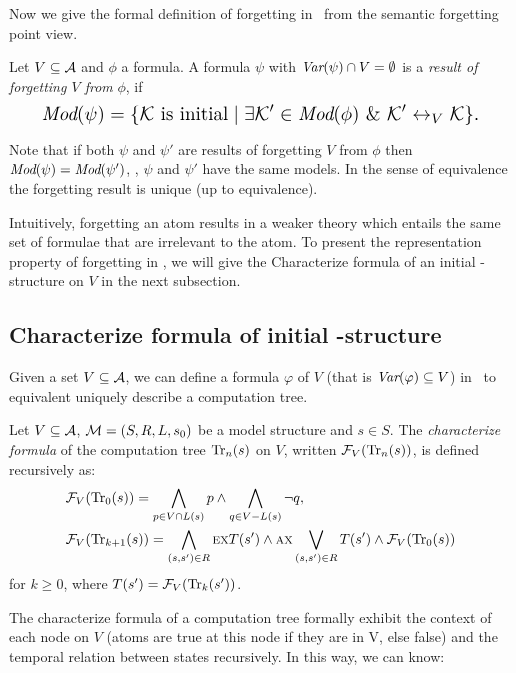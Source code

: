 \documentclass{article}
\begin{document}
Now we give the formal definition of forgetting in \CTL\ from the semantic forgetting point view.
\begin{definition}[Forgetting]\label{def:V:forgetting}
  Let $V\subseteq\cal A$ and $\phi$ a formula.
A formula $\psi$ with $\textit{Var}(\psi)\cap V=\emptyset$
is a {\em result of forgetting $V$ from} $\phi$, if
\begin{equation}
\resizebox{.91\linewidth}{!}{$
\displaystyle
  \Mod(\psi)=\{{\cal K}\mbox{ is initial}\mid \exists {\cal K}'\in\Mod(\phi)\ \&\ {\cal K}'\lrto_V{\cal K}\}.
  $}
\end{equation}
\end{definition}
Note that if both $\psi$ and $\psi'$ are results of forgetting $V$ from $\phi$ then
$\textit{Mod}(\psi)=\textit{Mod}(\psi')$, \ie, $\psi$ and $\psi'$ have the same models. In the sense
of equivalence the forgetting result is unique (up to equivalence).

Intuitively, forgetting an atom results in a weaker theory which entails the same set of formulae that are irrelevant to the atom.
To present the representation property of forgetting in \CTL, we will give the Characterize formula of an initial \MPK-structure on $V$ in the next subsection.

\subsection{Characterize formula of initial \MPK-structure}
Given a set $V\subseteq{\cal A}$, we can define a formula $\varphi$ of $V$ (that is $\textit{Var}(\varphi) \subseteq V$) in \CTL\ to equivalent uniquely describe a computation tree.
\begin{definition}\label{def:V:char:formula}
Let $V\subseteq {\cal A}$, ${\cal M} =(S,R,L,s_0)$ be a model structure and $s\in S$.
The {\em characterize formula} of the computation tree $\textrm{Tr}_n(s)$ on $V$,
written ${\cal F}_V(\textrm{Tr}_n(s))$, is defined recursively as:
\begin{align*}
  & {\cal F}_V(\textrm{Tr}_0(s)) = \bigwedge_{p \in V\cap L(s)}p
     \wedge \bigwedge_{q\in V-L(s)} \neg q,\\
  & {\cal F}_V(\textrm{Tr}_{k+1}(s)) = \bigwedge_{(s,s')\in R}
    \textsc{e} \textsc{x} T(s')
    \wedge
    \textsc{a} \textsc{x} \bigvee_{(s,s')\in R} T(s')
    \wedge {\cal F}_V(\textrm{Tr}_0(s))
\end{align*}
for $k\ge 0$, where $T(s') = {\cal F}_V(\textrm{Tr}_k(s'))$.
\end{definition}
The characterize formula of a computation tree formally exhibit the context of each node on $V$ (atoms are true at this node if they are in V, else false) and the temporal relation between states recursively. In this way, we can know:
\end{document}
